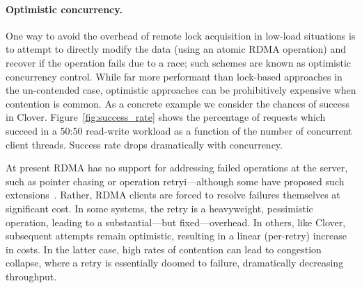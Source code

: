 \paragraph{Optimistic concurrency.}
One way to avoid the overhead of remote lock acquisition in low-load
situations is to attempt to directly modify the data (using an
atomic RDMA operation) and recover if the operation fails due to a
race; such schemes are known as optimistic concurrency control.  While
far more performant than lock-based approaches in the un-contended
case, optimistic approaches can be prohibitively expensive when
contention is common.  As a concrete example we consider the chances
of success in Clover.
Figure~\ref{fig:success_rate} shows the percentage of requests
which succeed in a 50:50 read-write workload as a function of the number of
concurrent client threads. Success rate drops dramatically with concurrency.

At present RDMA has no support for addressing failed operations at the
server, such as pointer chasing or operation retryi---although some
have proposed such extensions~\cite{rma,snap,prism}.  Rather, RDMA
clients are forced to resolve failures themselves at significant cost.
In some
systems, the retry is a heavyweight, pessimistic operation, leading to
a substantial---but fixed---overhead.  In others, like Clover,
subsequent attempts remain optimistic, resulting in a linear
(per-retry) increase in costs.  In the latter case,  high
rates of contention can lead to congestion collapse, where a retry is
essentially doomed to failure, dramatically decreasing
throughput.
%


